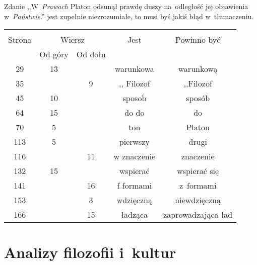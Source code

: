 \documentclass[a4paper,11pt]{article}
\begin{document}
\vspace{\spaceFour}


\start {} Zdanie ,,W~\emph{Prawach} Platon odsunął prawdę
duszy na~odległość jej objawienia w~\emph{Państwie}.'' jest zupełnie
niezrozumiałe, to musi byś jakiś błąd w~tłumaczeniu.



\begin{center}
  \begin{tabular}{|c|c|c|c|c|}
    \hline
    & \multicolumn{2}{c|}{} & & \\
    Strona & \multicolumn{2}{c|}{Wiersz} & Jest
                              & Powinno być \\ \cline{2-3}
    & Od góry & Od dołu & & \\
    \hline
    29  & 13 & & warunkowa & warunkową \\
    35  & &  9 & ,, Filozof %
           & ,,Filozof \\ %
    45  & 10 & & sposob & sposób \\
    64  & 15 & & do do & do \\
    70  &  5 & & ton & Platon \\
    113 &  5 & & pierwszy & drugi \\
    116 & & 11 & w znaczenie & znaczenie \\
    132 & 15 & & wspierać & wspierać się \\
    141 & & 16 & f formami & z~formami \\
    153 & &  3 & wdzięczną & niewdzięczną \\
    166 & & 15 & ładząca & zaprowadzająca ład \\
    \hline
  \end{tabular}
\end{center}

\vspace{\spaceTwo}





\newpage
\section{Analizy filozofii i~kultur}

\vspace{\spaceTwo}


\end{document}
